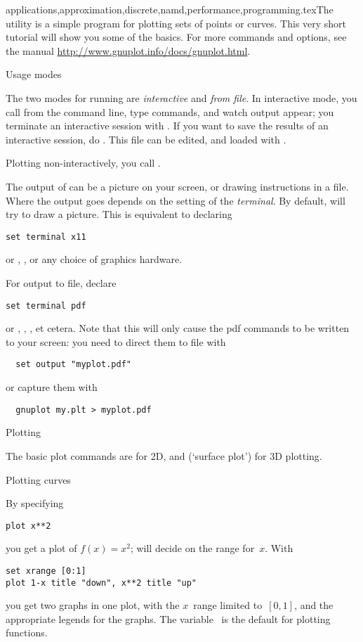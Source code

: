{applications,approximation,discrete,namd,performance,programming}.texThe  utility is a
simple program for plotting sets of points or curves. This very short
tutorial will show you some of the basics. For more commands and
options, see the manual
\url{http://www.gnuplot.info/docs/gnuplot.html}.

 {Usage modes}

The two modes for running  are \emph{interactive} and
\emph{from file}. In interactive mode, you call  from the
command line, type commands, and watch output appear; you terminate an
interactive session with .  If you want to save the results of
an interactive session, do . This file can be
edited, and loaded with .

Plotting non-interactively, you call .

The output of  can be a picture on your screen, or drawing
instructions in a file. Where the output goes depends on the setting
of the \emph{terminal}. By default,  will try to draw a
picture. This is equivalent to declaring
\begin{verbatim}
set terminal x11
\end{verbatim}
or , , or any choice of graphics hardware.

For output to file, declare
\begin{verbatim}
set terminal pdf
\end{verbatim}
or , , , et cetera. Note that this will only
cause the pdf commands to be written to your screen: you need to
direct them to file with
\begin{verbatim}
  set output "myplot.pdf"
\end{verbatim}
or capture them with
\begin{verbatim}
  gnuplot my.plt > myplot.pdf
\end{verbatim}

 {Plotting}

The basic plot commands are  for 2D, and  (`surface
plot') for 3D plotting.

 {Plotting curves}

By specifying
\begin{verbatim}
plot x**2
\end{verbatim}
you get a plot of $f(x)=x^2$;  will decide on the range
for~$x$.
With
\begin{verbatim}
set xrange [0:1]
plot 1-x title "down", x**2 title "up"
\end{verbatim}
you get two graphs in one plot, with the $x$~range limited to~$[0,1]$,
and the appropriate legends for the graphs. The variable~ is the
default for plotting functions.

